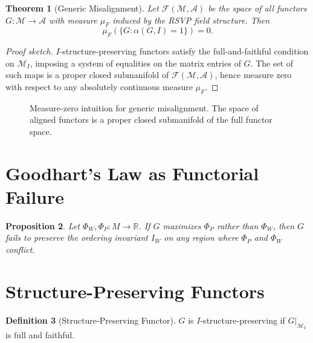 \documentclass[12pt,a4paper,oneside]{book}
\numberwithin{equation}{chapter}
\theoremstyle{plain}
\newtheorem{theorem}{Theorem}[chapter]
\newtheorem{proposition}[theorem]{Proposition}
\theoremstyle{definition}
\newtheorem{definition}[theorem]{Definition}
\theoremstyle{remark}
\begin{document}
\begin{theorem}[Generic Misalignment]
\label{thm:generic-misalignment}
Let $\mathcal{F}(\mathcal{M},\mathcal{A})$ be the space of all functors
$G : \mathcal{M} \rightarrow \mathcal{A}$ with measure $\mu_F$
induced by the RSVP field structure. Then
\[
\mu_F(\{G : \alpha(G,I) = 1\}) = 0.
\]
\end{theorem}

\begin{proof}[Proof sketch]
$I$-structure-preserving functors satisfy the full-and-faithful
condition on $\mathcal{M}_I$, imposing a system of equalities on
the matrix entries of $G$. The set of such maps is a proper closed
submanifold of $\mathcal{F}(\mathcal{M},\mathcal{A})$, hence
measure zero with respect to any absolutely continuous measure $\mu_F$.
\end{proof}

\begin{figure}[htbp]
\centering
{}
\caption{Measure-zero intuition for generic misalignment. The space
of aligned functors is a proper closed submanifold of the full functor
space.}
\label{fig:generic-misalignment-geometry}
\end{figure}

\section{Goodhart's Law as Functorial Failure}

\begin{proposition}
Let $\Phi_W, \Phi_P : M \rightarrow \mathbb{R}$. If $G$ maximizes
$\Phi_P$ rather than $\Phi_W$, then $G$ fails to preserve the
ordering invariant $I_W$ on any region where $\Phi_P$ and $\Phi_W$
conflict.
\end{proposition}

\section{Structure-Preserving Functors}

\begin{definition}[Structure-Preserving Functor]
$G$ is $I$-structure-preserving if $G|_{\mathcal{M}_I}$ is full
and faithful.
\end{definition}
\end{document}
